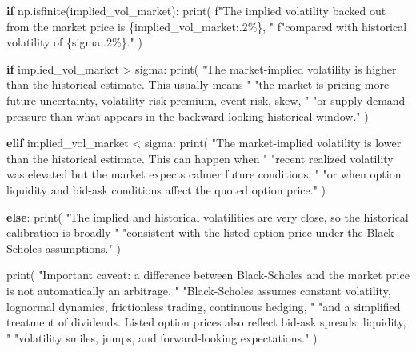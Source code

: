 \documentclass[
  11pt,
]{article}
\newenvironment{Shaded}{}{}
\newcommand{\BuiltInTok}[1]{\textcolor[rgb]{0.00,0.50,0.00}{#1}}
\newcommand{\ControlFlowTok}[1]{\textcolor[rgb]{0.00,0.44,0.13}{\textbf{#1}}}
\newcommand{\NormalTok}[1]{#1}
\newcommand{\OperatorTok}[1]{\textcolor[rgb]{0.40,0.40,0.40}{#1}}
\newcommand{\SpecialCharTok}[1]{\textcolor[rgb]{0.25,0.44,0.63}{#1}}
\newcommand{\SpecialStringTok}[1]{\textcolor[rgb]{0.73,0.40,0.53}{#1}}
\newcommand{\StringTok}[1]{\textcolor[rgb]{0.25,0.44,0.63}{#1}}
\begin{document}
\begin{Shaded}
\begin{Highlighting}[]
    \ControlFlowTok{if}\NormalTok{ np.isfinite(implied\_vol\_market):}
        \BuiltInTok{print}\NormalTok{(}
            \SpecialStringTok{f"The implied volatility backed out from the market price is }\SpecialCharTok{\{}\NormalTok{implied\_vol\_market}\SpecialCharTok{:.2\%\}}\SpecialStringTok{, "}
            \SpecialStringTok{f"compared with historical volatility of }\SpecialCharTok{\{}\NormalTok{sigma}\SpecialCharTok{:.2\%\}}\SpecialStringTok{."}
\NormalTok{        )}

        \ControlFlowTok{if}\NormalTok{ implied\_vol\_market }\OperatorTok{\textgreater{}}\NormalTok{ sigma:}
            \BuiltInTok{print}\NormalTok{(}
                \StringTok{"The market{-}implied volatility is higher than the historical estimate. This usually means "}
                \StringTok{"the market is pricing more future uncertainty, volatility risk premium, event risk, skew, "}
                \StringTok{"or supply{-}demand pressure than what appears in the backward{-}looking historical window."}
\NormalTok{            )}

        \ControlFlowTok{elif}\NormalTok{ implied\_vol\_market }\OperatorTok{\textless{}}\NormalTok{ sigma:}
            \BuiltInTok{print}\NormalTok{(}
                \StringTok{"The market{-}implied volatility is lower than the historical estimate. This can happen when "}
                \StringTok{"recent realized volatility was elevated but the market expects calmer future conditions, "}
                \StringTok{"or when option liquidity and bid{-}ask conditions affect the quoted option price."}
\NormalTok{            )}

        \ControlFlowTok{else}\NormalTok{:}
            \BuiltInTok{print}\NormalTok{(}
                \StringTok{"The implied and historical volatilities are very close, so the historical calibration is broadly "}
                \StringTok{"consistent with the listed option price under the Black{-}Scholes assumptions."}
\NormalTok{            )}

    \BuiltInTok{print}\NormalTok{(}
        \StringTok{"Important caveat: a difference between Black{-}Scholes and the market price is not automatically an arbitrage. "}
        \StringTok{"Black{-}Scholes assumes constant volatility, lognormal dynamics, frictionless trading, continuous hedging, "}
        \StringTok{"and a simplified treatment of dividends. Listed option prices also reflect bid{-}ask spreads, liquidity, "}
        \StringTok{"volatility smiles, jumps, and forward{-}looking expectations."}
\NormalTok{    )}


\end{Highlighting}
\end{Shaded}
\end{document}
